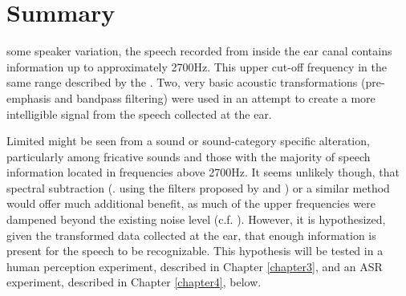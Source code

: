 \DIFdelbegin {}\DIFdelend \DIFaddbegin \section{Summary}\label{chap2:summary}

\DIFaddend some speaker variation, the speech recorded from inside the ear canal contains information up to approximately 2700Hz.  This upper cut-off frequency \DIFdelbegin {}\DIFdelend \DIFaddbegin {}\DIFaddend in the same range described by the \DIFdelbegin {}\DIFdelend \DIFaddbegin {}\DIFaddend .  Two, very basic acoustic transformations (pre-emphasis and bandpass filtering) were used in an attempt to create a more intelligible signal from the speech collected at the ear.

Limited \DIFdelbegin {}\DIFdelend \DIFaddbegin {}\DIFaddend might be seen from a sound or sound-category specific alteration, particularly among fricative sounds and those with the majority of speech information located in frequencies above 2700Hz.  It seems unlikely though, that spectral subtraction (\DIFdelbegin {}\DIFdelend \DIFaddbegin {}\DIFaddend . using the filters proposed by \cite{hansen:97b} and \cite{reinfeldt:10}) or a similar method would offer much additional benefit, as much of the upper frequencies were dampened beyond the existing noise level (c.f. \DIFdelbegin {}\DIFdelend \DIFaddbegin {}\DIFaddend ).  However, it is hypothesized, given the transformed data collected at the ear, that enough information is present for the speech to be recognizable.  This hypothesis will be tested in a human perception experiment, described in Chapter \ref{chapter3}, and an ASR experiment, described in Chapter \ref{chapter4}, below.







% 
% 
% 

